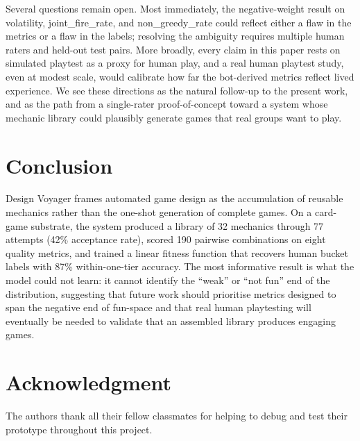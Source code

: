 \documentclass[conference]{IEEEtran}
\begin{document}
Several questions remain open. Most immediately, the negative-weight result on volatility, joint\_fire\_rate, and non\_greedy\_rate could reflect either a flaw in the metrics or a flaw in the labels; resolving the ambiguity requires multiple human raters and held-out test pairs. More broadly, every claim in this paper rests on simulated playtest as a proxy for human play, and a real human playtest study, even at modest scale, would calibrate how far the bot-derived metrics reflect lived experience. We see these directions as the natural follow-up to the present work, and as the path from a single-rater proof-of-concept toward a system whose mechanic library could plausibly generate games that real groups want to play.

\section{Conclusion}
Design Voyager frames automated game design as the accumulation of reusable   
  mechanics rather than the one-shot generation of complete games. On a       
  card-game substrate, the system produced a library of 32 mechanics through 77 
  attempts (42\% acceptance rate), scored 190 pairwise combinations on eight  
  quality metrics, and trained a linear fitness function that recovers human
  bucket labels with 87\% within-one-tier accuracy. The most informative result 
  is what the model could not learn: it cannot identify the ``weak'' or ``not
  fun'' end of the distribution, suggesting that future work should prioritise  
  metrics designed to span the negative end of fun-space and that real human  
  playtesting will eventually be needed to validate that an assembled library   
  produces engaging games.

\section*{Acknowledgment}
The authors thank all their fellow classmates for helping to debug and test their prototype throughout this project.



\end{document}
